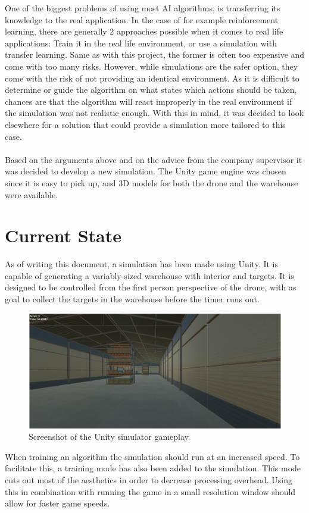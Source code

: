 \noindent
One of the biggest problems of using most \gls{AI} algorithms, is transferring its knowledge to the real application. In the case of for example reinforcement learning, there are generally 2 approaches possible when it comes to real life applications: Train it in the real life environment, or use a simulation with transfer learning. Same as with this project, the former is often too expensive and come with too many risks. However, while simulations are the safer option, they come with the risk of not providing an identical environment. As it is difficult to determine or guide the algorithm on what states which actions should be taken, chances are that the algorithm will react improperly in the real environment if the simulation was not realistic enough. With this in mind, it was decided to look elsewhere for a solution that could provide a simulation more tailored to this case.
\\\\
Based on the arguments above and on the advice from the company supervisor it was decided to develop a new simulation. The Unity game engine was chosen since it is easy to pick up, and 3D models for both the drone and the warehouse were available.

\section{Current State}
\label{sec:sim_status}
As of writing this document, a simulation has been made using Unity. It is capable of generating a variably-sized warehouse with interior and targets. It is designed to be controlled from the first person perspective of the drone, with as goal to collect the targets in the warehouse before the timer runs out.
\begin{figure}[h]
	\centering
	\includegraphics[width=\linewidth]{img/unity_drone.png}
	\caption{Screenshot of the Unity simulator gameplay.}
	\label{fig:unity_drone}
\end{figure}
\pagebreak
\noindent
When training an algorithm the simulation should run at an increased speed. To facilitate this, a training mode has also been added to the simulation. This mode cuts out most of the aesthetics in order to decrease processing overhead. Using this in combination with running the game in a small resolution window should allow for faster game speeds.

